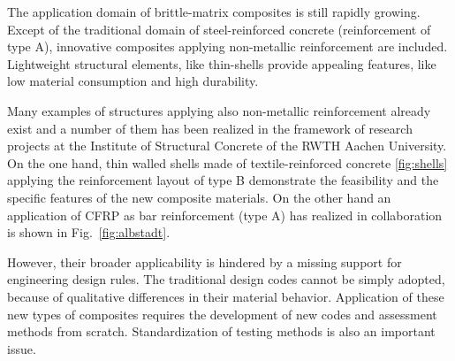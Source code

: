 \documentclass[main.tex]{subfiles}
\begin{document}
The application domain of brittle-matrix composites
is still rapidly growing. Except of the traditional domain of steel-reinforced concrete (reinforcement of type A), innovative composites applying non-metallic reinforcement are included. Lightweight structural elements, like thin-shells provide appealing features, like low material consumption and high durability. 

Many examples of structures applying also non-metallic reinforcement already exist and a number of them has been realized in the framework
of research projects at the Institute of Structural Concrete of the RWTH Aachen University. On the one hand, thin walled 
shells made of textile-reinforced concrete \ref{fig:shells} applying the reinforcement layout of type B 
demonstrate the feasibility and the specific features of the new composite materials. On the other hand 
an application of CFRP as bar reinforcement (type A) has realized in collaboration is shown in Fig.~\ref{fig:albstadt}.

However, their broader applicability is hindered by a missing support for engineering design rules. 
The traditional design codes cannot be simply adopted, because of qualitative differences in their material behavior. Application of these new types of composites requires the development of new codes and assessment methods from scratch. Standardization of testing methods is also an important issue.
\end{document}
